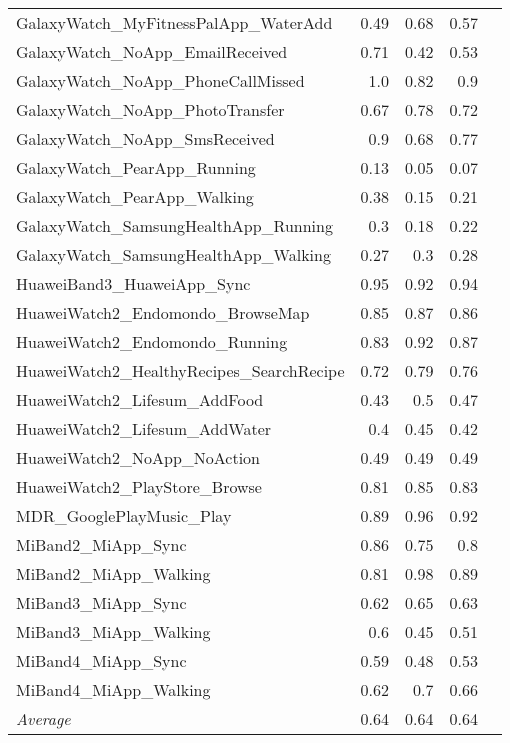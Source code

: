 \begin{tabular}{lrrrr}
    GalaxyWatch_MyFitnessPalApp_WaterAdd & 0.49 & 0.68 & 0.57 \\
    GalaxyWatch_NoApp_EmailReceived & 0.71 & 0.42 & 0.53 \\
    GalaxyWatch_NoApp_PhoneCallMissed & 1.0 & 0.82 & 0.9 \\
    GalaxyWatch_NoApp_PhotoTransfer & 0.67 & 0.78 & 0.72 \\
    GalaxyWatch_NoApp_SmsReceived & 0.9 & 0.68 & 0.77 \\
    GalaxyWatch_PearApp_Running & 0.13 & 0.05 & 0.07 \\
    GalaxyWatch_PearApp_Walking & 0.38 & 0.15 & 0.21 \\
    GalaxyWatch_SamsungHealthApp_Running & 0.3 & 0.18 & 0.22 \\
    GalaxyWatch_SamsungHealthApp_Walking & 0.27 & 0.3 & 0.28 \\
    HuaweiBand3_HuaweiApp_Sync & 0.95 & 0.92 & 0.94 \\
    HuaweiWatch2_Endomondo_BrowseMap & 0.85 & 0.87 & 0.86 \\
    HuaweiWatch2_Endomondo_Running & 0.83 & 0.92 & 0.87 \\
    HuaweiWatch2_HealthyRecipes_SearchRecipe & 0.72 & 0.79 & 0.76 \\
    HuaweiWatch2_Lifesum_AddFood & 0.43 & 0.5 & 0.47 \\
    HuaweiWatch2_Lifesum_AddWater & 0.4 & 0.45 & 0.42 \\
    HuaweiWatch2_NoApp_NoAction & 0.49 & 0.49 & 0.49 \\
    HuaweiWatch2_PlayStore_Browse & 0.81 & 0.85 & 0.83 \\
    MDR_GooglePlayMusic_Play & 0.89 & 0.96 & 0.92 \\
    MiBand2_MiApp_Sync & 0.86 & 0.75 & 0.8 \\
    MiBand2_MiApp_Walking & 0.81 & 0.98 & 0.89 \\
    MiBand3_MiApp_Sync & 0.62 & 0.65 & 0.63 \\
    MiBand3_MiApp_Walking & 0.6 & 0.45 & 0.51 \\
    MiBand4_MiApp_Sync & 0.59 & 0.48 & 0.53 \\
    MiBand4_MiApp_Walking & 0.62 & 0.7 & 0.66 \\
    \emph{Average} & 0.64 & 0.64 & 0.64 \\
\end{tabular}